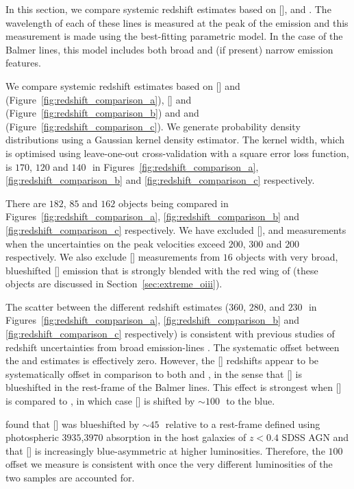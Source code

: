 In this section, we compare systemic redshift estimates based on [], \hb and \hans.
The wavelength of each of these lines is measured at the peak of the emission and this measurement is made using the best-fitting parametric model.
In the case of the Balmer lines, this model includes both broad and (if present) narrow emission features.

We compare systemic redshift estimates based on [] and \hb (Figure~\ref{fig:redshift_comparison_a}), [] and \ha (Figure~\ref{fig:redshift_comparison_b}) and \hb and \ha (Figure~\ref{fig:redshift_comparison_c}).
We generate probability density distributions using a Gaussian kernel density estimator.
The kernel width, which is optimised using leave-one-out cross-validation with a square error loss function, is $170$, $120$ and $140$\,\kms\, in Figures~\ref{fig:redshift_comparison_a}, \ref{fig:redshift_comparison_b} and \ref{fig:redshift_comparison_c} respectively.

There are $182$, $85$ and $162$ objects being compared in Figures~\ref{fig:redshift_comparison_a}, \ref{fig:redshift_comparison_b} and \ref{fig:redshift_comparison_c} respectively.
We have excluded [], \hb and \ha measurements when the uncertainties on the peak velocities exceed $200$, $300$ and $200$\,\kms\, respectively.
We also exclude [] measurements from $16$ objects with very broad, blueshifted [] emission that is strongly blended with the red wing of \hb (these objects are discussed in Section~\ref{sec:extreme_oiii}).

The scatter between the different redshift estimates ($360$, $280$, and $230$\,\kms\, in Figures~\ref{fig:redshift_comparison_a}, \ref{fig:redshift_comparison_b} and \ref{fig:redshift_comparison_c} respectively) is consistent with previous studies of redshift uncertainties from broad emission-lines \citep[e.g.][]{shen16b}.
The systematic offset between the \ha and \hb estimates is effectively zero.
However, the [] redshifts appear to be systematically offset in comparison to both \ha and \hbns, in the sense that [] is blueshifted in the rest-frame of the Balmer lines.
This effect is strongest when [] is compared to \hbns, in which case [] is shifted by $\sim100$\,\kms\, to the blue.

\citet{hewett10} found that [] was blueshifted by $\sim45$\,\kms\, relative to a rest-frame defined using photospheric \ll$3935$,$3970$ absorption in the host galaxies of $z<0.4$ SDSS AGN and that [] is increasingly blue-asymmetric at higher luminosities.
Therefore, the $100$\,\kms offset we measure is consistent with \citet{hewett10} once the very different luminosities of the two samples are accounted for.

